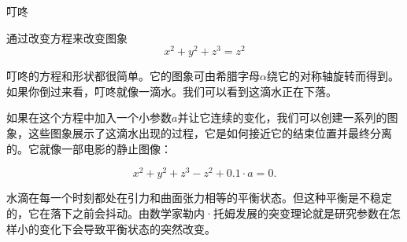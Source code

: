 ﻿\begin{surferPage}{叮咚}

通过改变方程来改变图象\\

\smallskip
\[x^2	+ y^2	+ z^3	= z^2\]

\singlespacing
叮咚的方程和形状都很简单。它的图象可由希腊字母$\alpha$绕它的对称轴旋转而得到。如果你倒过来看，叮咚就像一滴水。我们可以看到这滴水正在下落。

\newline
如果在这个方程中加入一个小参数$a$并让它连续的变化，我们可以创建一系列的图象，这些图象展示了这滴水出现的过程，它是如何接近它的结束位置并最终分离的。它就像一部电影的静止图像：

\[x^2	+ y^2	+ z^3	-z^2+0.1\cdot a=0.\]

水滴在每一个时刻都处在引力和曲面张力相等的平衡状态。但这种平衡是不稳定的，它在落下之前会抖动。由数学家勒内·托姆发展的突变理论就是研究参数在怎样小的变化下会导致平衡状态的突然改变。

\end{surferPage}

